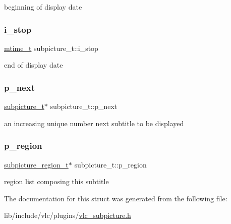 beginning of display date \mbox{\label{structsubpicture__t_a92078f5d576cdcd89056b16ed1c9007e}} 
\subsubsection{\texorpdfstring{i\+\_\+stop}{i\_stop}}
{\footnotesize\ttfamily \hyperlink{vlc__common_8h_a996e47c5ea061215703c26738351279e}{mtime\+\_\+t} subpicture\+\_\+t\+::i\+\_\+stop}

end of display date \mbox{\label{structsubpicture__t_a54d10f8d93fc0f176d32c53c59dbb04a}} 
\subsubsection{\texorpdfstring{p\+\_\+next}{p\_next}}
{\footnotesize\ttfamily \hyperlink{structsubpicture__t}{subpicture\+\_\+t}$\ast$ subpicture\+\_\+t\+::p\+\_\+next}

an increasing unique number next subtitle to be displayed \mbox{\label{structsubpicture__t_ad091daa3477dc3603d83471a786824a1}} 
\subsubsection{\texorpdfstring{p\+\_\+region}{p\_region}}
{\footnotesize\ttfamily \hyperlink{structsubpicture__region__t}{subpicture\+\_\+region\+\_\+t}$\ast$ subpicture\+\_\+t\+::p\+\_\+region}

region list composing this subtitle 

The documentation for this struct was generated from the following file\+:\begin{DoxyCompactItemize}
\item 
lib/include/vlc/plugins/\hyperlink{vlc__subpicture_8h}{vlc\+\_\+subpicture.\+h}\end{DoxyCompactItemize}
